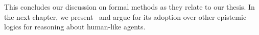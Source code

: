 This concludes our discussion on formal methods as they relate to our thesis. In the next chapter, we present \DASL\ and argue for its adoption over other epistemic logics for reasoning about human-like agents.


%
%


